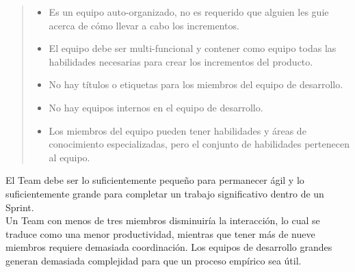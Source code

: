     \begin{quote}
    \begin{itemize}
        \item Es un equipo auto-organizado, no es requerido que alguien les guie
              acerca de cómo llevar a cabo los incrementos.

        \item El equipo debe ser multi-funcional y contener como equipo todas las
              habilidades necesarias para crear los incrementos del producto.

        \item No hay títulos o etiquetas para los miembros del equipo de desarrollo.

        \item No hay equipos internos en el equipo de desarrollo.

        \item Los miembros del equipo pueden tener habilidades y áreas de conocimiento
              especializadas, pero el conjunto de habilidades pertenecen al equipo.
    \end{itemize}
    \end{quote}
        
 \noindent El Team debe ser lo suficientemente pequeño para permanecer ágil y lo suficientemente grande
 para completar un trabajo significativo dentro de un Sprint.\\
        
 \noindent Un Team con menos de tres miembros disminuiría la interacción, lo cual se traduce como una
 menor productividad, mientras que tener más de nueve miembros requiere demasiada coordinación. Los
 equipos de desarrollo grandes generan demasiada complejidad para que un proceso empírico sea útil.



     
                                         
